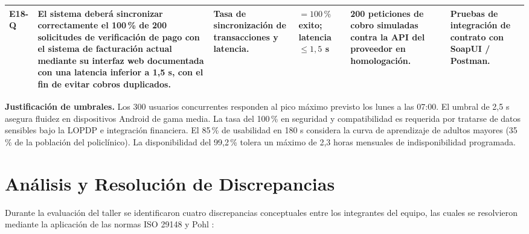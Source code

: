 \documentclass[conference]{IEEEtran}
\begin{document}
\begin{center}
\begin{tabularx}{\textwidth}{@{}p{0.8cm}Y p{2.2cm} p{1.3cm} p{2.6cm} p{2.1cm}@{}}
			\addlinespace[3pt]
			\textbf{E18-Q} & El sistema deber\'a sincronizar correctamente el \textbf{100\,\% de 200 solicitudes de verificaci\'on de pago} con el sistema de facturaci\'on actual mediante su interfaz web documentada con una latencia inferior a 1,5 s, con el fin de evitar cobros duplicados. & Tasa de sincronizaci\'on de transacciones y latencia. & $= 100\,\%$ exito; latencia $\leq 1{,}5$ s & 200 peticiones de cobro simuladas contra la API del proveedor en homologaci\'on. & Pruebas de integraci\'on de contrato con SoapUI / Postman.\\
			\bottomrule
		\end{tabularx}
	\end{center}
	
	\noindent\textbf{Justificaci\'on de umbrales.} Los 300 usuarios concurrentes responden al pico m\'aximo previsto los lunes a las 07:00. El umbral de 2,5 s asegura fluidez en dispositivos Android de gama media. La tasa del 100\,\% en seguridad y compatibilidad es requerida por tratarse de datos sensibles bajo la LOPDP \cite{lopdp2021} e integraci\'on financiera. El 85\,\% de usabilidad en 180 s considera la curva de aprendizaje de adultos mayores (35\,\% de la poblaci\'on del policl\'inico). La disponibilidad del 99,2\,\% tolera un m\'aximo de 2,3 horas mensuales de indisponibilidad programada.
	
	\section{An\'alisis y Resoluci\'on de Discrepancias}
	Durante la evaluaci\'on del taller se identificaron cuatro discrepancias conceptuales entre los integrantes del equipo, las cuales se resolvieron mediante la aplicaci\'on de las normas ISO 29148 y Pohl \cite{pohl2025, iso29148}:
	
\end{document}

